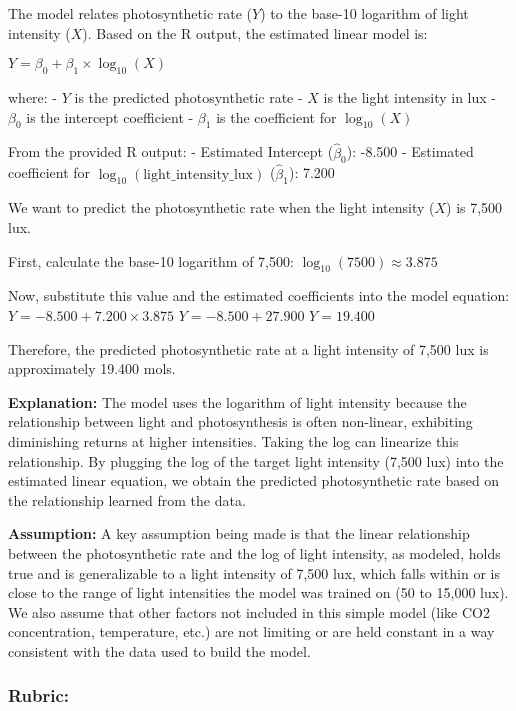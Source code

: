\documentclass[
  letterpaper,
  DIV=11,
  numbers=noendperiod]{scrartcl}
\begin{document}
The model relates photosynthetic rate (\(Y\)) to the base-10 logarithm
of light intensity (\(X\)). Based on the R output, the estimated linear
model is:

\(Y = \beta_0 + \beta_1 \times \log_{10}(X)\)

where: - \(Y\) is the predicted photosynthetic rate - \(X\) is the light
intensity in lux - \(\beta_0\) is the intercept coefficient -
\(\beta_1\) is the coefficient for \(\log_{10}(X)\)

From the provided R output: - Estimated Intercept (\(\hat{\beta}_0\)):
-8.500 - Estimated coefficient for
\(\log_{10}(\text{light\_intensity\_lux})\) (\(\hat{\beta}_1\)): 7.200

We want to predict the photosynthetic rate when the light intensity
(\(X\)) is 7,500 lux.

First, calculate the base-10 logarithm of 7,500:
\(\log_{10}(7500) \approx 3.875\)

Now, substitute this value and the estimated coefficients into the model
equation: \(Y = -8.500 + 7.200 \times 3.875\) \(Y = -8.500 + 27.900\)
\(Y = 19.400\)

Therefore, the predicted photosynthetic rate at a light intensity of
7,500 lux is approximately 19.400 mols.

\textbf{Explanation:} The model uses the logarithm of light intensity
because the relationship between light and photosynthesis is often
non-linear, exhibiting diminishing returns at higher intensities. Taking
the log can linearize this relationship. By plugging the log of the
target light intensity (7,500 lux) into the estimated linear equation,
we obtain the predicted photosynthetic rate based on the relationship
learned from the data.

\textbf{Assumption:} A key assumption being made is that the linear
relationship between the photosynthetic rate and the log of light
intensity, as modeled, holds true and is generalizable to a light
intensity of 7,500 lux, which falls within or is close to the range of
light intensities the model was trained on (50 to 15,000 lux). We also
assume that other factors not included in this simple model (like CO2
concentration, temperature, etc.) are not limiting or are held constant
in a way consistent with the data used to build the model.

\subsubsection{Rubric:}\label{rubric-1}
\end{document}
